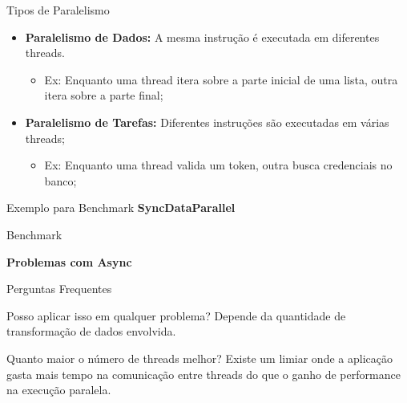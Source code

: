 \documentclass[10pt]{beamer}
\begin{document}
\begin{frame}{Tipos de Paralelismo}
	\begin{itemize}
		\item \textbf{Paralelismo de Dados:} A mesma instrução é executada em diferentes threads.
		\begin{itemize}
			\item Ex: Enquanto uma thread itera sobre a parte inicial de uma lista, outra itera sobre a parte final; 
		\end{itemize}
		\vspace{0.2cm}
		\item \textbf{Paralelismo de Tarefas:} Diferentes instruções são executadas em várias threads;
		\begin{itemize}
			\item Ex: Enquanto uma thread valida um token, outra busca credenciais no banco;
		\end{itemize}
	\end{itemize}
\end{frame}


\begin{frame}{Exemplo para Benchmark}
	\textbf{SyncDataParallel}
\end{frame}

\begin{frame}{Benchmark}
	\begin{figure}
	\end{figure}
	\textbf{Problemas com Async}
\end{frame}


\begin{frame}{Perguntas Frequentes}
	\begin{exampleblock}{Posso aplicar isso em qualquer problema?}
		Depende da quantidade de transformação de dados envolvida.
	\end{exampleblock}
	\vspace{0.2cm}
	\begin{exampleblock}{Quanto maior o número de threads melhor?}
		Existe um limiar onde a aplicação gasta mais tempo na comunicação entre threads do que o ganho de performance na execução paralela.
	\end{exampleblock}
\end{frame}
\end{document}
